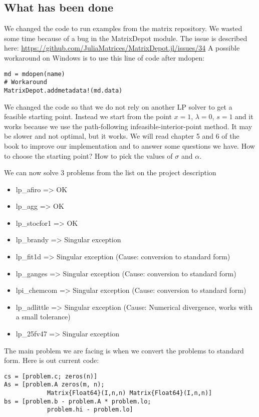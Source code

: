 \subsection{What has been done}\label{section:done}
We changed the code to run examples from the matrix repository. We wasted some time because of a bug in the MatrixDepot module. The issue is described here: \url{https://github.com/JuliaMatrices/MatrixDepot.jl/issues/34}
A possible workaround on Windows is to use this line of code after mdopen:
\begin{lstlisting}
md = mdopen(name)
# Workaround
MatrixDepot.addmetadata!(md.data)
\end{lstlisting}

We changed the code so that we do not rely on another LP solver to get a feasible starting point. Instead we start from the point $x=1$, $\lambda=0$, $s=1$ and it works because we use the path-following infeasible-interior-point method. It may be slower and not optimal, but it works. We will read chapter 5 and 6 of the book to improve our implementation and to answer some questions we have. How to choose the starting point? How to pick the values of $\sigma$ and $\alpha$.

We can now solve 3 problems from the list on the project description
\begin{itemize}
	\item lp\_afiro => OK 
	\item lp\_agg => OK 
	\item lp\_stocfor1 => OK
	\item lp\_brandy => Singular exception
	\item lp\_fit1d => Singular exception (Cause: conversion to standard form)
	\item lp\_ganges => Singular exception (Cause: conversion to standard form)
	\item lpi\_chemcom => Singular exception (Cause: conversion to standard form) 
	\item lp\_adlittle => Singular exception (Cause: Numerical divergence, works with a small tolerance) 
	\item lp\_25fv47 => Singular exception
\end{itemize}

The main problem we are facing is when we convert the problems to standard form. Here is out current code:
\begin{lstlisting}
cs = [problem.c; zeros(n)]
As = [problem.A zeros(m, n);
			Matrix{Float64}(I,n,n) Matrix{Float64}(I,n,n)]
bs = [problem.b - problem.A * problem.lo;
			problem.hi - problem.lo]
\end{lstlisting}

